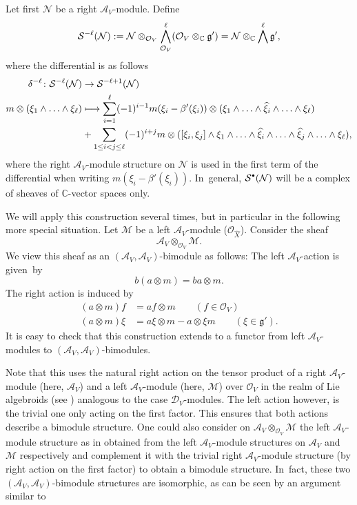 \documentclass[JEP,XML,SOM,Unicode,published]{cedram}
\let\mathds\mathbb
\newcommand\mto{\mathchoice{\longmapsto}{\mapsto}{\mapsto}{\mapsto}}
\newcommand{\sbullet}{{\scriptscriptstyle\bullet}}
\newcommand{\csbullet}{{\raisebox{1pt}{$\sbullet$}}}
\newcommand{\dC}{{\mathds C}}\let\C\dC
\newcommand{\cA}{\mathscr{A}}
\newcommand{\cM}{\mathcal{M}}
\newcommand{\cN}{\mathcal{N}}
\newcommand{\cO}{\mathcal{O}}\let\O\cO
\newcommand{\cS}{\mathcal{S}}
\newcommand{\frg}{\mathfrak{g}}
\let\originalleft\left
\let\originalright\right
\renewcommand{\left}{\mathopen{}\mathclose\bgroup\originalleft}
\renewcommand{\right}{\aftergroup\egroup\originalright}
\begin{document}
Let first $\cN$ be a right $\cA_V$\nobreakdash-mod\-ule. Define
\[
\cS^{-\ell}(\cN) :=
\cN \otimes_{\cO_V}
\bigwedge_{\cO_V}^\ell \left(\cO_V\otimes_\dC \frg'\right)
=
\cN \otimes_\dC \bigwedge^\ell \frg',
\]
where the differential is as follows
\begin{align}\label{eq:DiffEKCESComplex}
\delta^{-\ell} \colon \cS^{-\ell}(\cN) &\to \cS^{-\ell+1}(\cN) \\\notag
m \otimes (\xi_1 \wedge \ldots \wedge \xi_\ell) &\mto  \sum_{i=1}^\ell (-1)^{i-1} m (\xi_i-\beta'(\xi_i)) \otimes (\xi_1 \wedge \ldots \wedge \widehat{\xi}_i \wedge\ldots \wedge \xi_\ell)\\\notag
& +\sum\limits_{1 \leq i < j \leq \ell} (-1)^{i+j} m \otimes ([\xi_i,\xi_j] \wedge \xi_1 \wedge \ldots \wedge \widehat{\xi}_i \wedge \ldots \wedge \widehat{\xi}_j \wedge \ldots \wedge \xi_\ell),
\end{align}
where the right $\cA_V$\nobreakdash-mod\-ule structure on $\cN$ is used in the first term of the differential when writing $m (\xi_i-\beta'(\xi_i))$. In~general, $\cS^{\csbullet}(\cN)$ will be a complex of sheaves of $\dC$-vector spaces only.

We will apply this construction several times, but in particular in the following more special situation.
Let $\mathcal{M}$ be a left $\mathscr{A}_V$\nobreakdash-mod\-ule (\eg $\mathcal{O}_{\hat{X}}$). Consider the sheaf
\[
\mathscr{A}_V\otimes_{\mathcal{O}_V}\mathcal{M}.
\]
We view this sheaf as an $(\mathscr{A}_V,\mathscr{A}_V)$-bimodule as follows: The left $\mathscr{A}_V$-action is given~by
\[
b(a\otimes m) = ba\otimes m.
\]
The right action is induced by
\begin{align*}
(a\otimes m)f &= af \otimes m \qquad (f\in \mathcal{O}_V)\\
(a\otimes m)\xi &= a\xi \otimes m - a \otimes \xi m\qquad (\xi \in \mathfrak{g}').
\end{align*}
It is easy to check that this construction extends to a functor from left $\cA_V$\nobreakdash-mod\-ules to $(\cA_V,\cA_V)$-bimodules.

Note that this uses the natural right action on the tensor product of a right $\cA_V$\nobreakdash-mod\-ule (here, $\cA_V$) and a left $\cA_V$\nobreakdash-mod\-ule (here, $\cM$) over $\O_V$ in the realm of Lie algebroids (see \eg \cite[Prop.\,2.2.1]{Che99}) analogous to the case $\mathscr D_V$\nobreakdash-mod\-ules. The left action however, is the trivial one only acting on the first factor. This ensures that both actions describe a bimodule structure. One could also consider on $\cA_V \otimes_{\cO_V} \cM$ the left $\cA_V$\nobreakdash-mod\-ule structure as in \cite[\S (2.1)]{Huebschmann} obtained from the left $\cA_V$\nobreakdash-mod\-ule structures on $\cA_V$ and $\cM$ respectively and complement it with the trivial right $\cA_V$\nobreakdash-mod\-ule structure (by right action on the first factor) to obtain a bimodule structure. In~fact, these two $(\cA_V,\cA_V)$-bimodule structures are isomorphic, as can be seen by an argument similar to \cite[Cor.\,A.12]{Narvaez-Duality-BS}
\end{document}
